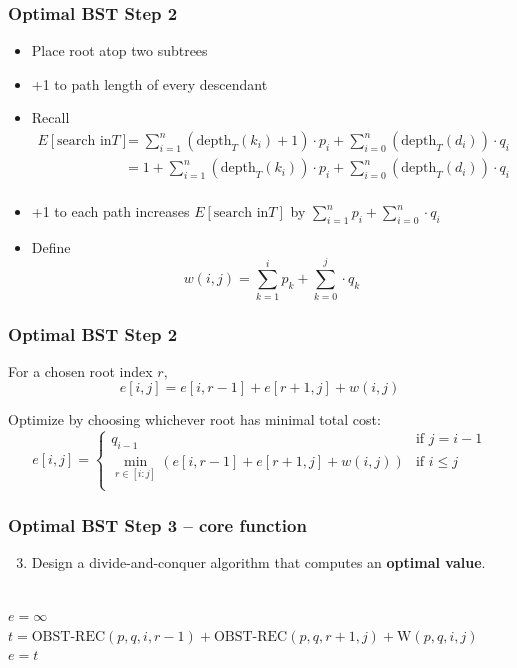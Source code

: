 \documentclass{beamer}
\newcommand{\stanza}{ \\~\ }
\begin{document}
\begin{frame} \frametitle{Optimal BST Step 2}
  \begin{itemize}
    \item Place root atop two subtrees
    \item +1 to path length of every descendant
    \item Recall
      \begin{align*}
        E[\text{search in} T] & = \sum_{i=1}^n (\text{depth}_T(k_i)+1) \cdot p_i + \sum_{i=0}^n (\text{depth}_T(d_i)) \cdot q_i \\
          & = 1 + \sum_{i=1}^n (\text{depth}_T(k_i)) \cdot p_i + \sum_{i=0}^n (\text{depth}_T(d_i)) \cdot q_i \\
      \end{align*}
    \item +1 to each path increases $E[\text{search in} T]$ by
      $ \sum_{i=1}^n p_i + \sum_{i=0}^n \cdot q_i $
    \item Define
      \[ w(i, j) = \sum_{k=1}^i p_k + \sum_{k=0}^j \cdot q_k \]
    \end{itemize}
\end{frame}

\begin{frame} \frametitle{Optimal BST Step 2}
  For a chosen root index $r,$
  \[ e[i, j] = e[i, r-1] + e[r+1, j] + w(i, j) \]

  Optimize by choosing whichever root has minimal total cost:
  \[
    e[i, j] = 
        \begin{cases}
          q_{i-1} & \text{if } j=i-1 \\
          \min_{r \in [i:j]} (e[i, r-1] + e[r+1, j] + w(i, j)) & \text{if } i \leq j \\
        \end{cases} 
  \]
\end{frame}

\begin{frame} \frametitle{Optimal BST Step 3 -- core function}
  \begin{enumerate}
    \setcounter{enumi}{2}
    \item Design a divide-and-conquer algorithm that computes an \textbf{optimal value}.
    \stanza
  \end{enumerate}

  {\scriptsize
  \begin{algorithmic}[1]
      \State {}
    \EndIf
    \State $e = \infty$
      \State $t = \text{OBST-REC}(p, q, i, r-1) + \text{OBST-REC}(p, q, r+1, j) + \text{W}(p, q, i, j)$
        \State $e = t$
      \EndIf
    \EndFor
    \State {}
    \EndFunction
  \end{algorithmic}
  }
\end{frame}
\end{document}
